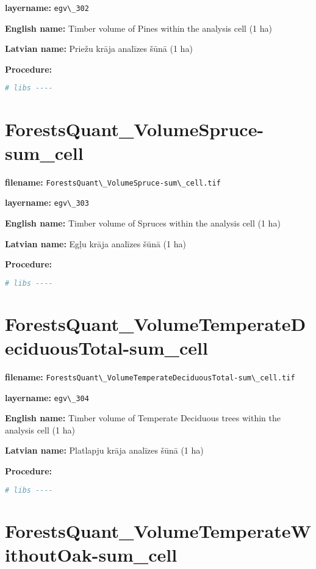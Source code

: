 \documentclass[
]{book}
\newcommand{\passthrough}[1]{#1}
\begin{document}
\textbf{layername:} \passthrough{\lstinline!egv\_302!}

\textbf{English name:} Timber volume of Pines within the analysis cell (1 ha)

\textbf{Latvian name:} Priežu krāja analīzes šūnā (1 ha)

\textbf{Procedure:}

\begin{lstlisting}[language=R]
# libs ----
\end{lstlisting}

\section{ForestsQuant\_VolumeSpruce-sum\_cell}\label{ch06.303}

\textbf{filename:} \passthrough{\lstinline!ForestsQuant\_VolumeSpruce-sum\_cell.tif!}

\textbf{layername:} \passthrough{\lstinline!egv\_303!}

\textbf{English name:} Timber volume of Spruces within the analysis cell (1 ha)

\textbf{Latvian name:} Egļu krāja analīzes šūnā (1 ha)

\textbf{Procedure:}

\begin{lstlisting}[language=R]
# libs ----
\end{lstlisting}

\section{ForestsQuant\_VolumeTemperateDeciduousTotal-sum\_cell}\label{ch06.304}

\textbf{filename:} \passthrough{\lstinline!ForestsQuant\_VolumeTemperateDeciduousTotal-sum\_cell.tif!}

\textbf{layername:} \passthrough{\lstinline!egv\_304!}

\textbf{English name:} Timber volume of Temperate Deciduous trees within the analysis cell (1 ha)

\textbf{Latvian name:} Platlapju krāja analīzes šūnā (1 ha)

\textbf{Procedure:}

\begin{lstlisting}[language=R]
# libs ----
\end{lstlisting}

\section{ForestsQuant\_VolumeTemperateWithoutOak-sum\_cell}\label{ch06.305}
\end{document}
